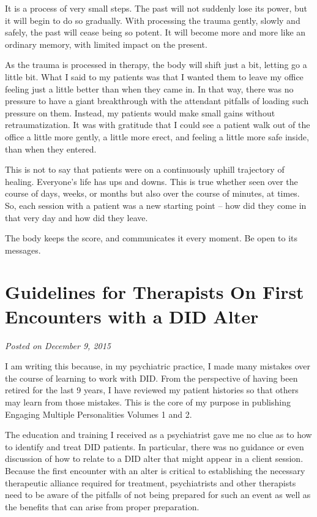 \documentclass[]{book}
\begin{document}
It is a process of very small steps. The past will not suddenly lose its power, but it will begin to do so gradually. With processing the trauma gently, slowly and safely, the past will cease being so potent. It will become more and more like an ordinary memory, with limited impact on the present.

As the trauma is processed in therapy, the body will shift just a bit, letting go a little bit. What I said to my patients was that I wanted them to leave my office feeling just a little better than when they came in. In that way, there was no pressure to have a giant breakthrough with the attendant pitfalls of loading such pressure on them. Instead, my patients would make small gains without retraumatization. It was with gratitude that I could see a patient walk out of the office a little more gently, a little more erect, and feeling a little more safe inside, than when they entered.

This is not to say that patients were on a continuously uphill trajectory of healing. Everyone's life has ups and downs. This is true whether seen over the course of days, weeks, or months but also over the course of minutes, at times. So, each session with a patient was a new starting point -- how did they come in that very day and how did they leave.

The body keeps the score, and communicates it every moment. Be open to its messages.

\hypertarget{guidelines-for-therapists-on-first-encounters-with-a-did-alter}{%
\section{Guidelines for Therapists On First Encounters with a DID Alter}\label{guidelines-for-therapists-on-first-encounters-with-a-did-alter}}

\emph{Posted on December 9, 2015}

I am writing this because, in my psychiatric practice, I made many mistakes over the course of learning to work with DID. From the perspective of having been retired for the last 9 years, I have reviewed my patient histories so that others may learn from those mistakes. This is the core of my purpose in publishing Engaging Multiple Personalities Volumes 1 and 2.

The education and training I received as a psychiatrist gave me no clue as to how to identify and treat DID patients. In particular, there was no guidance or even discussion of how to relate to a DID alter that might appear in a client session. Because the first encounter with an alter is critical to establishing the necessary therapeutic alliance required for treatment, psychiatrists and other therapists need to be aware of the pitfalls of not being prepared for such an event as well as the benefits that can arise from proper preparation.
\end{document}
